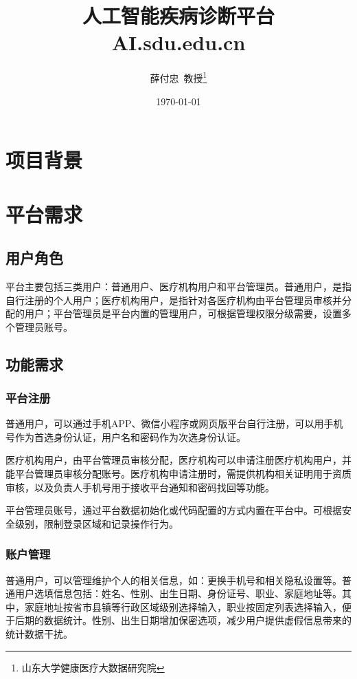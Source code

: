 \documentclass[UTF8,a4paper,12pt, onecolumn]{ctexart}
\title{人工智能疾病诊断平台\\AI.sdu.edu.cn}
\author{薛付忠~教授\thanks{山东大学健康医疗大数据研究院}}
\date{\today}
\begin{document}
    \maketitle
    \thispagestyle{fancy}
    
\tableofcontents

\section{项目背景}



\section{平台需求}

\subsection{用户角色}

平台主要包括三类用户：普通用户、医疗机构用户和平台管理员。普通用户，是指自行注册的个人用户；医疗机构用户，是指针对各医疗机构由平台管理员审核并分配的用户；平台管理员是平台内置的管理用户，可根据管理权限分级需要，设置多个管理员账号。

\subsection{功能需求}

\subsubsection{平台注册}

普通用户，可以通过手机APP、微信小程序或网页版平台自行注册，可以用手机号作为首选身份认证，用户名和密码作为次选身份认证。

医疗机构用户，由平台管理员审核分配，医疗机构可以申请注册医疗机构用户，并能平台管理员审核分配账号。医疗机构申请注册时，需提供机构相关证明用于资质审核，以及负责人手机号用于接收平台通知和密码找回等功能。

平台管理员账号，通过平台数据初始化或代码配置的方式内置在平台中。可根据安全级别，限制登录区域和记录操作行为。

\subsubsection{账户管理}

普通用户，可以管理维护个人的相关信息，如：更换手机号和相关隐私设置等。普通用户选填信息包括：姓名、性别、出生日期、身份证号、职业、家庭地址等。其中，家庭地址按省市县镇等行政区域级别选择输入，职业按固定列表选择输入，便于后期的数据统计。性别、出生日期增加保密选项，减少用户提供虚假信息带来的统计数据干扰。
\end{document}
